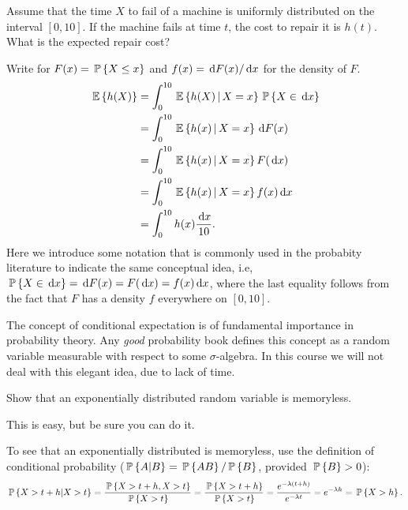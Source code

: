 \begin{question}
  Assume that the time $X$ to fail of a machine is uniformly
  distributed on the interval $[0,10]$. If the machine fails at time
  $t$, the cost to repair it is $h(t)$. What is the expected repair
  cost? 
  \begin{solution}
    Write for $F(x) = \P{X\leq x}$ and $f(x) = \d F(x)/\d x$ for the
    density of $F$.
    \begin{equation*}
      \begin{split}
\E{h(X)}
&= \int_0^{10} \E{h(X) \given X = x} \P{X\in \d x} \\
&= \int_0^{10} \E{h(x) \given X = x} \d F(x) \\
&= \int_0^{10} \E{h(x) \given X = x} F(\d x) \\
&= \int_0^{10} \E{h(x) \given X = x} f(x) \d x \\
&= \int_0^{10} h(x)\frac{\d x}{10}.
      \end{split}
    \end{equation*}
    Here we introduce some notation that is commonly used in the
    probabity literature to indicate the same conceptual idea, i.e,
    $\P{X\in \d x} = \d F(x) = F(\d x) = f(x) \d x$, where the last
    equality follows from the fact that $F$ has a density $f$
    everywhere on $[0,10]$. 

    The concept of conditional expectation is of fundamental
    importance in probability theory. Any \emph{good} probability book
    defines this concept as a random variable measurable with respect
    to some $\sigma$-algebra. In this course we will not deal with
    this elegant idea, due to lack of time. 

  \end{solution}
\end{question}


\begin{question}
  Show that an exponentially distributed random variable is
  memoryless.  
  \begin{solution}
This is easy, but be sure you can do it. 

To see that an exponentially
distributed is memoryless, use the definition of conditional
probability ($\P{A|B} = \P{AB}/\P{B}$, provided $\P{B}>0$):
\begin{equation*}
  \P{X>t+h|X>t} = \frac{\P{X>t+h, X>t}}{\P{X>t}} = \frac{\P{X>t+h}}{\P{X>t}} = \frac{e^{-\lambda(t+h)}}{e^{-\lambda t}} = e^{-\lambda h} = \P{X>h}.
\end{equation*}
  \end{solution}
\end{question}

